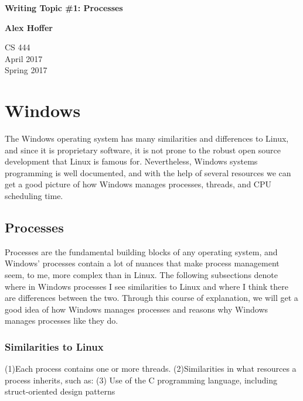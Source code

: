 \documentclass[letterpaper,10pt,titlepage]{article}
\begin{document}
\begin{titlepage}
    \begin{center}
        \vspace*{3.5cm}

        \textbf{Writing Topic \#1: Processes}

        \vspace{0.5cm}

        \textbf{Alex Hoffer}

        \vspace{0.8cm}

        CS 444\\
        April 2017\\
	Spring 2017\\

        \vfill

    \end{center}
\end{titlepage}

\newpage

\tableofcontents

\newpage



\section{Windows}
\cite{rus122} \cite{rus121} 
\cite{mck15} \cite{ker10} \cite{har04}
The Windows operating system has many similarities and differences to Linux, and
 since it is proprietary software, it is not prone to the robust open source development that Linux is famous for. Nevertheless, Windows systems programming is well documented, and with the help of several resources we can get a good picture of how Windows manages processes, threads, and CPU scheduling time. 
\subsection{Processes}
Processes are the fundamental building blocks of any operating system, and Windows' processes contain a lot of nuances that make process management seem, to me, more complex than in Linux. The following subsections denote where in Windows processes I see similarities to Linux and where I think there are differences between the two. Through this course of explanation, we will get a good idea of how Windows manages processes and reasons why Windows manages processes like they do. 
\subsubsection{Similarities to Linux}
(1)Each process contains one or more threads.
(2)Similarities in what resources a process inherits, such as:
(3) Use of the C programming language, including struct-oriented design patterns
\end{document}
